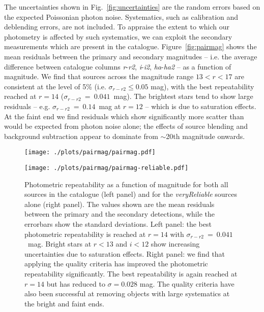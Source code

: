 \documentclass[useAMS,usenatbib]{mn2e}
\begin{document}
The uncertainties shown in Fig.~\ref{fig:uncertainties}
are the random errors based on the expected Poissonian photon noise.
Systematics, such as calibration and deblending errors,
are not included.
To appraise the extent to which our photometry is affected
by such systematics, we can exploit the
secondary measurements which are present in the catalogue.
Figure~\ref{fig:pairmag} shows the mean residuals between
the primary and secondary magnitudes
-- i.e. the average difference between catalogue columns \emph{r}-\emph{r2},
\emph{i}-\emph{i2}, \emph{ha}-\emph{ha2} -- as a function of magnitude.
We find that sources across the magnitude range 
$13 < r < 17$ are consistent at the level of 5\%
(i.e. $\sigma_{r-r2} \le 0.05$ mag),
with the best repeatability
reached at $r=14$ ($\sigma_{r-r2}~=~0.041$~mag).
The brightest stars tend to show large residuals
-- e.g. $\sigma_{r-r2}~=~0.14$~mag at $r=12$ --
which is due to saturation effects.
At the faint end we find residuals which
show significantly more scatter than would be expected
from photon noise alone;
the effects of source blending and background subtraction
appear to dominate from $\sim$20th magnitude onwards.

\begin{figure*}
\begin{minipage}[b]{0.45\linewidth}
\centering
\texttt{[image: ./plots/pairmag/pairmag.pdf]}
\label{fig:pairmag}
\end{minipage}
\hspace{0.5cm}
\begin{minipage}[b]{0.45\linewidth}
\centering
\texttt{[image: ./plots/pairmag/pairmag-reliable.pdf]}
\label{fig:pairmag_reliable}
\end{minipage}
\caption{Photometric repeatability as a function of magnitude
         for both all sources in the catalogue (left panel)
         and for the \emph{veryReliable} sources alone (right panel).
         The values shown are the mean residuals
         between the primary and the secondary detections,
         while the errorbars show the standard deviations.
         Left panel: 
         the best photometric repeatability is reached at $r=14$
         with $\sigma_{r-r2}~=~0.041$~mag.
         Bright stars at $r<13$ and $i<12$ 
         show increasing uncertainties due to saturation effects.
         Right panel: we find that applying the quality criteria
         has improved the photometric repeatability significantly.
         The best repeatability is again reached at $r=14$
         but has reduced to $\sigma=0.028$ mag.
         The quality criteria have also been successful
         at removing objects with large systematics at the bright
         and faint ends.
    }
\end{figure*}
\end{document}
